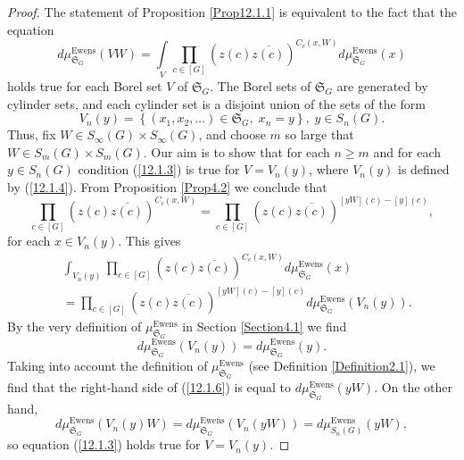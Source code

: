 \documentclass[12pt]{amsart}
\theoremstyle{definition}
\numberwithin{equation}{section}
\DeclareMathOperator{\Ewens}{Ewens}
\begin{document}
\begin{proof} The statement of Proposition \ref{Prop12.1.1} is equivalent to the fact that the equation
\begin{equation}\label{12.1.3}
d\mu_{\mathfrak{S}_G}^{\Ewens}\left(VW\right)=\int\limits_{V}\prod\limits_{c\in [G]}\left(z(c)\overline{z(c)}\right)^{C_{c}(x,W)}d\mu_{\mathfrak{S}_G}^{\Ewens}(x)
\end{equation}
holds true for each Borel set $V$ of $\mathfrak{S}_G$. The Borel sets of $\mathfrak{S}_G$ are generated by cylinder sets, and each cylinder set is a disjoint union of the sets of the form
\begin{equation}\label{12.1.4}
V_n(y)=\left\{\left(x_1,x_2,\ldots\right)\in\mathfrak{S}_G,\; x_n=y\right\},\; y\in S_n(G).
\end{equation}
Thus, fix $W\in S_{\infty}(G)\times S_{\infty}(G)$, and choose $m$ so large that $W\in S_m(G)\times S_m(G)$. Our aim is to show that for each $n\geq m$ and for each $y\in S_n(G)$ condition (\ref{12.1.3}) is true for $V=V_n(y)$, where $V_n(y)$ is defined by
(\ref{12.1.4}). From Proposition \ref{Prop4.2} we conclude that
\begin{equation}\label{12.1.5}
\prod\limits_{c\in[G]}\left(z(c)\overline{z(c)}\right)^{C_c(x,W)}
=\prod\limits_{c\in[G]}\left(z(c)\overline{z(c)}\right)^{\left[yW\right](c)-\left[y\right](c)},
\end{equation}
for each $x\in V_n(y)$. This gives
\begin{equation}\label{12.1.6}
\begin{split}
&\int_{V_n(y)}\prod\limits_{c\in[G]}\left(z(c)\overline{z(c)}\right)^{C_c(x,W)}
d\mu^{\Ewens}_{\mathfrak{S}_G}(x)\\
&=\prod\limits_{c\in[G]}\left(z(c)\overline{z(c)}\right)^{\left[yW\right](c)-[y](c)}d\mu^{\Ewens}_{\mathfrak{S}_G}(V_n(y)).
\end{split}
\end{equation}
By the very definition of $\mu_{\mathfrak{S}_G}^{\Ewens}$ in Section \ref{Section4.1} we find
\begin{equation}
d\mu_{\mathfrak{S}_G}^{\Ewens}\left(V_n(y)\right)
=d\mu_{\mathfrak{S}_G}^{\Ewens}(y).
\end{equation}
Taking into account the definition of $\mu_{\mathfrak{S}_G}^{\Ewens}$ (see Definition \ref{Definition2.1}), we find that the right-hand side of (\ref{12.1.6})
is equal to $d\mu_{\mathfrak{S}_G}^{\Ewens}(yW )$. On the other hand,
$$
d\mu_{\mathfrak{S}_G}^{\Ewens}\left(V_n(y)W\right)=d\mu_{\mathfrak{S}_G}^{\Ewens}\left(V_n(yW)\right)=d\mu_{S_n(G)}^{\Ewens}(yW),
$$
so equation (\ref{12.1.3}) holds true  for $V=V_n(y)$.
\end{proof}
\end{document}
